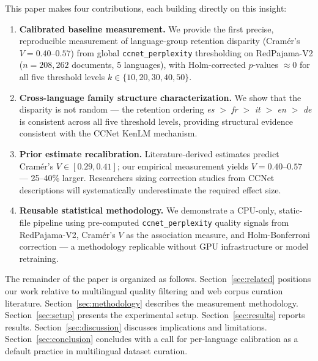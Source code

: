 This paper makes four contributions, each building directly on this insight:

\begin{enumerate}
\item \textbf{Calibrated baseline measurement.} We provide the first precise, reproducible measurement of language-group retention disparity (Cram{\'e}r's $V = 0.40$--$0.57$) from global \texttt{ccnet\_perplexity} thresholding on RedPajama-V2 ($n = 208,262$ documents, 5 languages), with Holm-corrected $p$-values $\approx 0$ for all five threshold levels $k \in \{10, 20, 30, 40, 50\}$.

\item \textbf{Cross-language family structure characterization.} We show that the disparity is not random --- the retention ordering \textit{es} $>$ \textit{fr} $>$ \textit{it} $>$ \textit{en} $>$ \textit{de} is consistent across all five threshold levels, providing structural evidence consistent with the CCNet KenLM mechanism.

\item \textbf{Prior estimate recalibration.} Literature-derived estimates predict Cram{\'e}r's $V \in [0.29, 0.41]$; our empirical measurement yields $V = 0.40$--$0.57$ --- 25--40\% larger. Researchers sizing correction studies from CCNet descriptions will systematically underestimate the required effect size.

\item \textbf{Reusable statistical methodology.} We demonstrate a CPU-only, static-file pipeline using pre-computed \texttt{ccnet\_perplexity} quality signals from RedPajama-V2, Cram{\'e}r's $V$ as the association measure, and Holm-Bonferroni correction --- a methodology replicable without GPU infrastructure or model retraining.
\end{enumerate}

The remainder of the paper is organized as follows. Section~\ref{sec:related} positions our work relative to multilingual quality filtering and web corpus curation literature. Section~\ref{sec:methodology} describes the measurement methodology. Section~\ref{sec:setup} presents the experimental setup. Section~\ref{sec:results} reports results. Section~\ref{sec:discussion} discusses implications and limitations. Section~\ref{sec:conclusion} concludes with a call for per-language calibration as a default practice in multilingual dataset curation.
